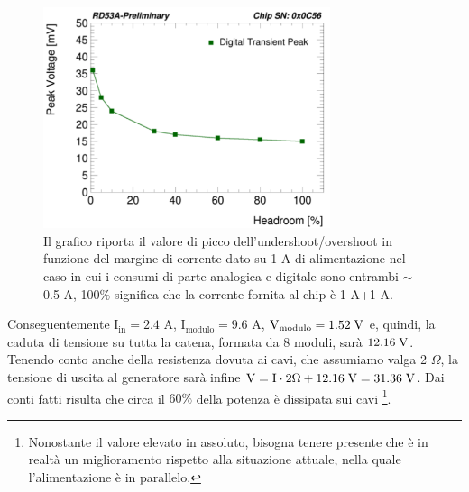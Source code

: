 \begin{figure}
\centering
\includegraphics[width=0.75\textwidth]{Immagini/LoadTransientDominik}
\caption{Il grafico riporta il valore di picco dell'undershoot/overshoot in funzione del margine di corrente dato su 1 A di alimentazione nel caso in cui  i consumi di parte analogica e digitale sono entrambi $\sim$0.5 A, 100$\%$ significa che la corrente fornita al chip è 1 A+1 A.}
\label{LoadTransient}
\end{figure}
Conseguentemente $\mathrm{I_{in}=2.4}$ A, $\mathrm{I_{modulo}=9.6}$ A, $\mathrm{V_{modulo}=1.52} \rm \; V$ e, quindi, la caduta di tensione su tutta la catena, formata da 8 moduli, sarà $12.16 \rm \; V$.
Tenendo conto anche della resistenza dovuta ai cavi, che assumiamo valga 2 $\Omega$, la tensione di uscita al generatore sarà infine $\mathrm{V=I \cdot 2 \Omega +12.16 \rm \; V=31.36 \rm \; V}$.
  Dai conti fatti risulta che circa il $60 \%$ della potenza è dissipata sui cavi
\footnote{
  Nonostante il valore elevato in assoluto, bisogna tenere presente che è in realtà un miglioramento rispetto alla situazione attuale, nella quale l'alimentazione è in parallelo.
}. %

